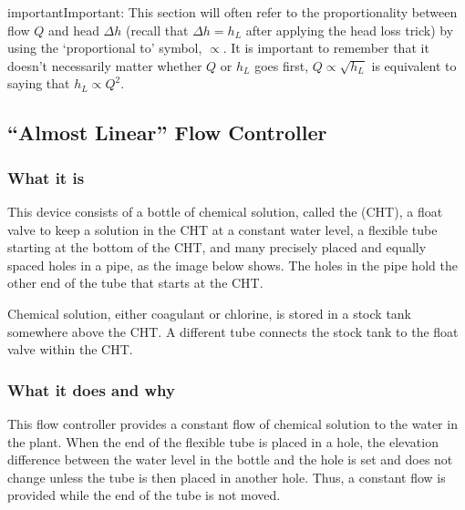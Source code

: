 \documentclass[letterpaper,10pt,english]{sphinxmanual}
\begin{document}
\begin{sphinxadmonition}{important}{Important:}
This section will often refer to the proportionality between flow \(Q\) and head \(\Delta h\) (recall that \(\Delta h = h_L\) after applying the head loss trick) by using the ‘proportional to’ symbol, \(\propto\). It is important to remember that it doesn’t necessarily matter whether \(Q\) or \(h_L\) goes first, \(Q \propto \sqrt{h_L}\) is equivalent to saying that \(h_L \propto Q^2\).
\end{sphinxadmonition}


\subsection{“Almost Linear” Flow Controller}
\label{\detokenize{Flow_Control_and_Measurement/FCM_Design:almost-linear-flow-controller}}\label{\detokenize{Flow_Control_and_Measurement/FCM_Design:id4}}

\subsubsection{What it is}
\label{\detokenize{Flow_Control_and_Measurement/FCM_Design:what-it-is}}
This device consists of a bottle of chemical solution, called the  (CHT), a float valve to keep a solution in the CHT at a constant water level, a flexible tube starting at the bottom of the CHT, and many precisely placed and equally spaced holes in a pipe, as the image below shows. The holes in the pipe hold the other end of the tube that starts at the CHT.

Chemical solution, either coagulant or chlorine, is stored in a stock tank somewhere above the CHT. A different tube connects the stock tank to the float valve within the CHT.


\subsubsection{What it does and why}
\label{\detokenize{Flow_Control_and_Measurement/FCM_Design:what-it-does-and-why}}
This flow controller provides a constant flow of chemical solution to the water in the plant. When the end of the flexible tube is placed in a hole, the elevation difference between the water level in the bottle and the hole is set and does not change unless the tube is then placed in another hole. Thus, a constant flow is provided while the end of the tube is not moved.
\end{document}
